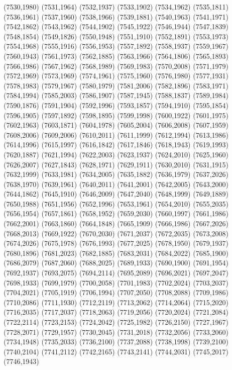 (7530,1980)
(7531,1964)
(7532,1937)
(7533,1902)
(7534,1962)
(7535,1811)
(7536,1961)
(7537,1960)
(7538,1966)
(7539,1881)
(7540,1963)
(7541,1971)
(7542,1862)
(7543,1962)
(7544,1902)
(7545,1922)
(7546,1944)
(7547,1839)
(7548,1854)
(7549,1826)
(7550,1948)
(7551,1910)
(7552,1891)
(7553,1973)
(7554,1968)
(7555,1916)
(7556,1953)
(7557,1892)
(7558,1937)
(7559,1967)
(7560,1943)
(7561,1973)
(7562,1885)
(7563,1966)
(7564,1806)
(7565,1893)
(7566,1986)
(7567,1962)
(7568,1989)
(7569,1983)
(7570,2008)
(7571,1979)
(7572,1969)
(7573,1969)
(7574,1961)
(7575,1960)
(7576,1980)
(7577,1931)
(7578,1983)
(7579,1967)
(7580,1979)
(7581,2006)
(7582,1896)
(7583,1971)
(7584,1994)
(7585,2003)
(7586,1907)
(7587,1945)
(7588,1837)
(7589,1984)
(7590,1876)
(7591,1904)
(7592,1996)
(7593,1857)
(7594,1910)
(7595,1854)
(7596,1905)
(7597,1892)
(7598,1895)
(7599,1998)
(7600,1922)
(7601,1975)
(7602,1963)
(7603,1871)
(7604,1978)
(7605,2004)
(7606,2008)
(7607,1959)
(7608,2006)
(7609,2006)
(7610,2011)
(7611,1999)
(7612,1994)
(7613,1986)
(7614,1996)
(7615,1997)
(7616,1842)
(7617,1846)
(7618,1943)
(7619,1993)
(7620,1887)
(7621,1994)
(7622,2003)
(7623,1937)
(7624,2010)
(7625,1960)
(7626,2007)
(7627,1843)
(7628,1971)
(7629,1911)
(7630,2010)
(7631,1915)
(7632,1999)
(7633,1981)
(7634,2005)
(7635,1882)
(7636,1979)
(7637,2026)
(7638,1970)
(7639,1961)
(7640,2011)
(7641,2001)
(7642,2005)
(7643,2000)
(7644,1862)
(7645,1910)
(7646,2009)
(7647,2040)
(7648,1999)
(7649,1889)
(7650,1988)
(7651,1956)
(7652,1996)
(7653,1961)
(7654,2010)
(7655,2035)
(7656,1954)
(7657,1861)
(7658,1952)
(7659,2030)
(7660,1997)
(7661,1986)
(7662,2001)
(7663,1860)
(7664,1848)
(7665,1909)
(7666,1986)
(7667,2026)
(7668,2013)
(7669,1922)
(7670,2030)
(7671,2037)
(7672,2035)
(7673,2008)
(7674,2026)
(7675,1978)
(7676,1993)
(7677,2025)
(7678,1950)
(7679,1937)
(7680,1896)
(7681,2023)
(7682,1885)
(7683,2031)
(7684,2022)
(7685,1900)
(7686,2079)
(7687,2060)
(7688,2025)
(7689,1933)
(7690,1900)
(7691,1954)
(7692,1937)
(7693,2075)
(7694,2114)
(7695,2089)
(7696,2021)
(7697,2047)
(7698,1933)
(7699,1979)
(7700,2058)
(7701,1983)
(7702,2024)
(7703,2037)
(7704,2021)
(7705,1919)
(7706,1994)
(7707,2050)
(7708,2088)
(7709,1986)
(7710,2086)
(7711,1930)
(7712,2119)
(7713,2062)
(7714,2064)
(7715,2020)
(7716,2035)
(7717,2037)
(7718,2063)
(7719,2056)
(7720,2024)
(7721,2084)
(7722,2114)
(7723,2153)
(7724,2042)
(7725,1982)
(7726,2150)
(7727,1967)
(7728,2071)
(7729,1957)
(7730,2045)
(7731,2018)
(7732,2056)
(7733,2060)
(7734,1948)
(7735,2033)
(7736,2100)
(7737,2088)
(7738,1998)
(7739,2100)
(7740,2104)
(7741,2112)
(7742,2165)
(7743,2141)
(7744,2031)
(7745,2017)
(7746,1943)
